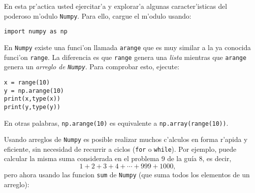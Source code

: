 \documentclass[11pt]{exam}
\begin{document}
\firstpageheadrule
\runningheadrule
{}
\cfoot{ }
\begin{flushleft}
\vspace{0.2in}

\vspace{0.25cm}
\end{flushleft}

\begin{questions}

\item En esta pr'actica usted ejercitar'a y explorar'a algunas caracter'isticas del poderoso m'odulo \texttt{Numpy}. Para ello, cargue el m'odulo usando:

\begin{verbatim}
import numpy as np
\end{verbatim}

\item En \texttt{Numpy} existe una funci'on llamada \texttt{arange} que es muy similar a la ya conocida funci'on \texttt{range}. La diferencia es que \texttt{range} genera una \textit{lista} mientras que \texttt{arange} genera un \textit{arreglo de \texttt{Numpy}}. Para comprobar esto, ejecute:

\begin{verbatim}
x = range(10)
y = np.arange(10)
print(x,type(x))
print(y,type(y))
\end{verbatim}

En otras palabras, \texttt{np.arange(10)} es equivalente a \texttt{np.array(range(10))}.

\item Usando arreglos de \texttt{Numpy} es posible realizar muchos c'alculos en forma r'apida y eficiente, sin necesidad de recurrir a ciclos (\texttt{for} o \texttt{while}). Por ejemplo, puede calcular la misma suma considerada en el problema 9 de la guía 8, es decir, 
\begin{equation}
1 + 2 + 3 + 4  + \cdots + 999 + 1000,
\end{equation}
pero ahora usando las funcion \texttt{sum} de \texttt{Numpy} (que suma todos los elementos de un arreglo):


\end{questions}
\end{document}
